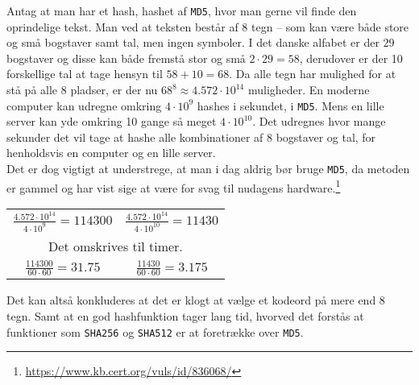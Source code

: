 \begin{eks}
    \label{brutefc}
    Antag at man har et hash, hashet af \texttt{MD5}, hvor man gerne vil finde den oprindelige tekst.
    Man ved at teksten består af 8 tegn -- som kan være både store og små bogstaver samt tal, men ingen symboler.
    I det danske alfabet er der \(29\) bogstaver og disse kan både fremstå stor og små \(2 \cdot 29 = 58\), derudover er der 10 forskellige tal at tage hensyn til \(58 + 10 = 68\).
    Da alle tegn har mulighed for at stå på alle 8 pladser, er der nu \(68^8\approx 4.572 \cdot 10^{14}\) muligheder.
    En moderne computer kan udregne omkring \(4 \cdot 10^9\) hashes i sekundet, i \texttt{MD5}.
    Mens en lille server kan yde omkring 10 gange så meget \(4 \cdot 10^{10}\).\cite{ytpwd}
    Det udregnes hvor mange sekunder det vil tage at hashe alle kombinationer af 8 bogstaver og tal, for henholdsvis en computer og en lille server.\\
    Det er dog vigtigt at understrege, at man i dag aldrig bør bruge \texttt{MD5}, da metoden er gammel og har vist sige at være for svag til nudagens hardware.\footnote{\url{https://www.kb.cert.org/vuls/id/836068/}}

    \setlength{\tabcolsep}{50pt} %
    \begin{center}
        \begin{tabular}{c c}

            \(\frac{4.572 \cdot 10^{14}}{4 \cdot 10^9} = 114300\) &
            \(\frac{4.572 \cdot 10^{14}}{4 \cdot 10^{10}} = 11430\)\\

            \multicolumn{2}{c}{Det omskrives til timer.}\\

            \(\frac{114300}{60 \cdot 60} = 31.75\) &
            \(\frac{11430}{60 \cdot 60} = 3.175\)\\

        \end{tabular}
    \end{center}

    \noindent
    Det kan altså konkluderes at det er klogt at vælge et kodeord på mere end 8 tegn.
    Samt at en god hashfunktion tager lang tid, hvorved det forstås at funktioner som \texttt{SHA256} og \texttt{SHA512} er at foretrække over \texttt{MD5}.
\end{eks}

